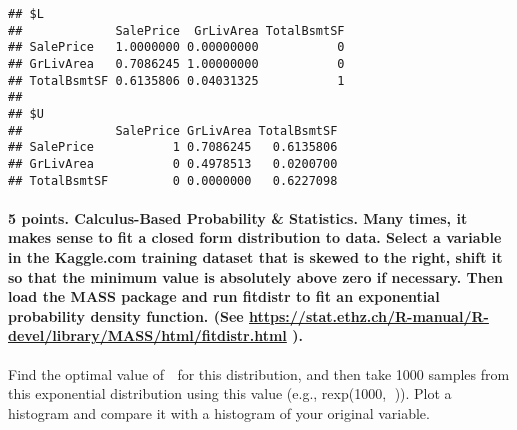 \documentclass[]{article}
\let\oldparagraph\paragraph
\renewcommand{\paragraph}[1]{\oldparagraph{#1}\mbox{}}
\begin{document}
\begin{verbatim}
## $L
##             SalePrice  GrLivArea TotalBsmtSF
## SalePrice   1.0000000 0.00000000           0
## GrLivArea   0.7086245 1.00000000           0
## TotalBsmtSF 0.6135806 0.04031325           1
## 
## $U
##             SalePrice GrLivArea TotalBsmtSF
## SalePrice           1 0.7086245   0.6135806
## GrLivArea           0 0.4978513   0.0200700
## TotalBsmtSF         0 0.0000000   0.6227098
\end{verbatim}

\hypertarget{points.-calculus-based-probability-statistics.-many-times-it-makes-sense-to-fit-a-closed-form-distribution-to-data.-select-a-variable-in-the-kaggle.com-training-dataset-that-is-skewed-to-the-right-shift-it-so-that-the-minimum-value-is-absolutely-above-zero-if-necessary.-then-load-the-mass-package-and-run-fitdistr-to-fit-an-exponential-probability-density-function.-see-httpsstat.ethz.chr-manualr-devellibrarymasshtmlfitdistr.html-.}{%
\paragraph{\texorpdfstring{5 points. Calculus-Based Probability \&
Statistics. Many times, it makes sense to fit a closed form distribution
to data. Select a variable in the Kaggle.com training dataset that is
skewed to the right, shift it so that the minimum value is absolutely
above zero if necessary. Then load the MASS package and run fitdistr to
fit an exponential probability density function. (See
\url{https://stat.ethz.ch/R-manual/R-devel/library/MASS/html/fitdistr.html}
).}{5 points. Calculus-Based Probability \& Statistics. Many times, it makes sense to fit a closed form distribution to data. Select a variable in the Kaggle.com training dataset that is skewed to the right, shift it so that the minimum value is absolutely above zero if necessary. Then load the MASS package and run fitdistr to fit an exponential probability density function. (See https://stat.ethz.ch/R-manual/R-devel/library/MASS/html/fitdistr.html ).}}\label{points.-calculus-based-probability-statistics.-many-times-it-makes-sense-to-fit-a-closed-form-distribution-to-data.-select-a-variable-in-the-kaggle.com-training-dataset-that-is-skewed-to-the-right-shift-it-so-that-the-minimum-value-is-absolutely-above-zero-if-necessary.-then-load-the-mass-package-and-run-fitdistr-to-fit-an-exponential-probability-density-function.-see-httpsstat.ethz.chr-manualr-devellibrarymasshtmlfitdistr.html-.}}

Find the optimal value of  for this distribution, and then take 1000
samples from this exponential distribution using this value (e.g.,
rexp(1000, )). Plot a histogram and compare it with a histogram of your
original variable.
\end{document}
